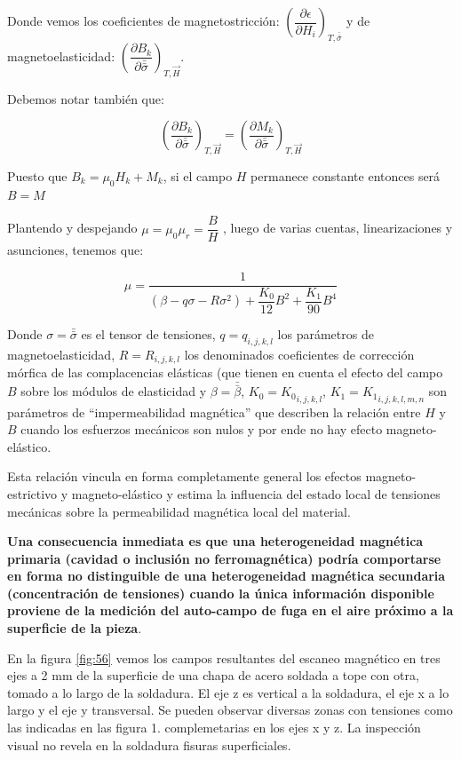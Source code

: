 Donde vemos los coeficientes de magnetostricción: $\left(\dfrac{\partial \epsilon}{\partial H_{i}} \right)_{T,\bar{\bar{\sigma}}}$ y de magnetoelasticidad: $\left(\dfrac{\partial B_{k}}{\partial \bar{\bar{\sigma}}} \right)_{T,\overrightarrow{H}}$.

Debemos notar también que:	

\begin{equation}
	\label{eq:526}
\left(\dfrac{\partial B_{k}}{\partial \bar{\bar{\sigma}}} \right)_{T,\overrightarrow{H}}=
\left(\dfrac{\partial M_{k}}{\partial \bar{\bar{\sigma}}} \right)_{T,\overrightarrow{H}}
\end{equation}

Puesto que $B_{k}=\mu_{0}H_{k}+M_{k}$, si el campo $H$ permanece constante entonces será $B=M$

Plantendo y despejando $\mu=\mu_{0} \mu_{r} = \dfrac{B}{H} $ , luego de varias cuentas, linearizaciones y asunciones, tenemos que:

\begin{equation}
	\label{eq:527}
	\mu= \dfrac{1}{(\beta-q\sigma-R\sigma^{2})+\dfrac{K_{0}}{12}B^{2}+\dfrac{K_{1}}{90}B^{4}}
\end{equation}

Donde $\sigma=\bar{\bar{\sigma}}$ es el tensor de tensiones, $q=q_{i,j,k,l}$ los parámetros de magnetoelasticidad, $R=R_{i,j,k,l}$ los denominados coeficientes de corrección mórfica de las complacencias elásticas (que tienen en cuenta el efecto del campo $B$ sobre los módulos de elasticidad y $\beta=\bar{\bar{\beta}}$, $K_{0}={K_{0}}_{i,j,k,l}$, $K_{1}={K_{1}}_{i,j,k,l,m,n}$ son parámetros de “impermeabilidad magnética” que describen la relación entre $H$ y $B$ cuando los esfuerzos mecánicos son nulos y por ende no hay efecto magneto-elástico.

Esta relación vincula en forma completamente general los efectos magneto-estrictivo y magneto-elástico y estima la influencia del estado local de tensiones mecánicas sobre la permeabilidad magnética local del material.

\textbf{Una consecuencia inmediata es que una heterogeneidad magnética primaria (cavidad o inclusión no ferromagnética) podría comportarse en forma no distinguible de una heterogeneidad magnética secundaria (concentración de tensiones) cuando la única información disponible proviene de la medición del auto-campo de fuga en el aire próximo a la superficie de la pieza}.


En la figura \ref{fig:56} vemos los campos resultantes del escaneo magnético en tres ejes a 2 mm de la superficie de una chapa de acero soldada a tope con otra, tomado a lo largo de la soldadura. El eje z es vertical a la soldadura, el eje x a lo largo y el eje y transversal.
Se pueden observar diversas zonas con tensiones como las indicadas en las figura 1. complemetarias en los ejes x y z. La inspección visual no revela en la soldadura fisuras superficiales.

